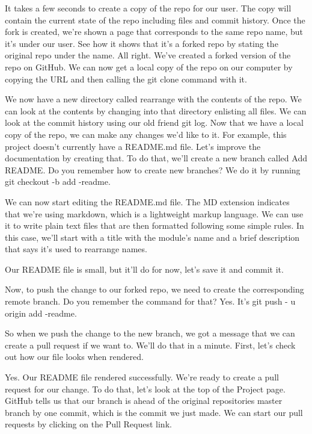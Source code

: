 	It takes a few seconds to create a copy of the repo for our user. The copy will contain the current state of the repo including files and commit history. Once the fork is created, we're shown a page that corresponds to the same repo name, but it's under our user. See how it shows that it's a forked repo by stating the original repo under the name. All right. We've created a forked version of the repo on GitHub. We can now get a local copy of the repo on our computer by copying the URL and then calling the git clone command with it.
	
	We now have a new directory called rearrange with the contents of the repo. We can look at the contents by changing into that directory enlisting all files. We can look at the commit history using our old friend git log. Now that we have a local copy of the repo, we can make any changes we'd like to it. For example, this project doesn't currently have a README.md file. Let's improve the documentation by creating that. To do that, we'll create a new branch called Add README. Do you remember how to create new branches? We do it by running git checkout -b add -readme.
	
	We can now start editing the README.md file. The MD extension indicates that we're using markdown, which is a lightweight markup language. We can use it to write plain text files that are then formatted following some simple rules. In this case, we'll start with a title with the module's name and a brief description that says it's used to rearrange names.
	
	Our README file is small, but it'll do for now, let's save it and commit it.
	
	Now, to push the change to our forked repo, we need to create the corresponding remote branch. Do you remember the command for that? Yes. It's git push - u origin add -readme.
	
	So when we push the change to the new branch, we got a message that we can create a pull request if we want to. We'll do that in a minute. First, let's check out how our file looks when rendered.
	
	Yes. Our README file rendered successfully. We're ready to create a pull request for our change. To do that, let's look at the top of the Project page. GitHub tells us that our branch is ahead of the original repositories master branch by one commit, which is the commit we just made. We can start our pull requests by clicking on the Pull Request link.
	
